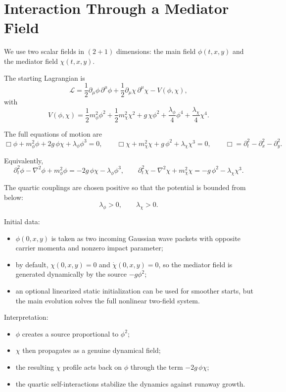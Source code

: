\section*{Interaction Through a Mediator Field}

We use two scalar fields in $(2+1)$ dimensions: the main field $\phi(t,x,y)$ and the mediator field $\chi(t,x,y)$.

The starting Lagrangian is
\[
\mathcal L=
\frac12\partial_\mu\phi\,\partial^\mu\phi
+\frac12\partial_\mu\chi\,\partial^\mu\chi
-V(\phi,\chi),
\]
with
\[
V(\phi,\chi)=
\frac12 m_\phi^2\phi^2
+\frac12 m_\chi^2\chi^2
+g\,\chi\phi^2
+\frac{\lambda_\phi}{4}\phi^4
+\frac{\lambda_\chi}{4}\chi^4.
\]

The full equations of motion are
\[
\Box\phi+m_\phi^2\phi+2g\,\phi\chi+\lambda_\phi\phi^3=0,
\qquad
\Box\chi+m_\chi^2\chi+g\,\phi^2+\lambda_\chi\chi^3=0,
\qquad
\Box=\partial_t^2-\partial_x^2-\partial_y^2.
\]

Equivalently,
\[
\partial_t^2\phi-\nabla^2\phi+m_\phi^2\phi=-2g\,\phi\chi-\lambda_\phi\phi^3,
\qquad
\partial_t^2\chi-\nabla^2\chi+m_\chi^2\chi=-g\,\phi^2-\lambda_\chi\chi^3.
\]

The quartic couplings are chosen positive so that the potential is bounded from below:
\[
\lambda_\phi>0,\qquad \lambda_\chi>0.
\]

Initial data:

\begin{itemize}
\item $\phi(0,x,y)$ is taken as two incoming Gaussian wave packets with opposite carrier momenta and nonzero impact parameter;
\item by default, $\chi(0,x,y)=0$ and $\dot\chi(0,x,y)=0$, so the mediator field is generated dynamically by the source $-g\phi^2$;
\item an optional linearized static initialization can be used for smoother starts, but the main evolution solves the full nonlinear two-field system.
\end{itemize}

Interpretation:

\begin{itemize}
\item $\phi$ creates a source proportional to $\phi^2$;
\item $\chi$ then propagates as a genuine dynamical field;
\item the resulting $\chi$ profile acts back on $\phi$ through the term $-2g\,\phi\chi$;
\item the quartic self-interactions stabilize the dynamics against runaway growth.
\end{itemize}
